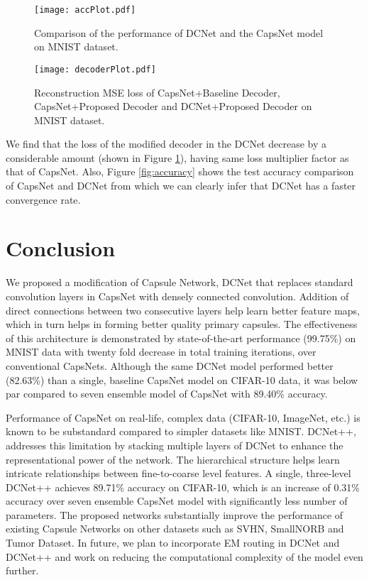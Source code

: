 \documentclass{bmvc2k}
\begin{document}
\begin{figure}[t]
   \begin{minipage}{0.48\textwidth}
     \centering
		\texttt{[image: accPlot.pdf]}
        \vspace{3px}
   		\caption{Comparison of the performance of DCNet and the CapsNet model on MNIST dataset.}
		\label{fig:accuracy}
   \end{minipage}\hfill
   \begin {minipage}{0.48\textwidth}
     \centering
		\texttt{[image: decoderPlot.pdf]}
		\label{fig:reconstructionLoss}
        \vspace{-8px}
   		\caption{Reconstruction MSE loss of CapsNet+Baseline Decoder, CapsNet+Proposed Decoder and DCNet+Proposed Decoder on MNIST dataset.}
   \end{minipage}  
\end{figure}


We find that the loss of the modified decoder in the DCNet decrease by a considerable amount (shown in Figure \ref{fig:reconstructionLoss}), having same loss multiplier factor as that of CapsNet. Also, Figure \ref{fig:accuracy} shows the test accuracy comparison of CapsNet and DCNet from which we can clearly infer that DCNet has a faster convergence rate.

\section{Conclusion}
We proposed a modification of Capsule Network, DCNet that replaces standard convolution layers in CapsNet with densely connected convolution. Addition of direct connections between two consecutive layers help learn better feature maps, which in turn helps in forming better quality primary capsules. The effectiveness of this architecture is demonstrated by state-of-the-art performance (99.75\%) on MNIST data with twenty fold decrease in total training iterations, over conventional CapsNets. Although the same DCNet model performed better (82.63\%) than a single, baseline CapsNet model on CIFAR-10 data, it was below par compared to seven ensemble model of CapsNet with 89.40\% accuracy.

Performance of CapsNet on real-life, complex data (CIFAR-10, ImageNet, etc.) is known to be substandard compared to simpler datasets like MNIST. DCNet++, addresses this limitation by stacking multiple layers of DCNet to enhance the representational power of the network. The hierarchical structure helps learn intricate relationships between fine-to-coarse level features. A single, three-level DCNet++ achieves 89.71\% accuracy on CIFAR-10, which is an increase of 0.31\% accuracy over seven ensemble CapsNet model with significantly less number of parameters. The proposed networks substantially improve the performance of existing Capsule Networks on other datasets such as SVHN, SmallNORB and Tumor Dataset. In future, we plan to incorporate EM routing \cite{EM} in DCNet and DCNet++ and work on reducing the computational complexity of the model even further.


\end{document}
